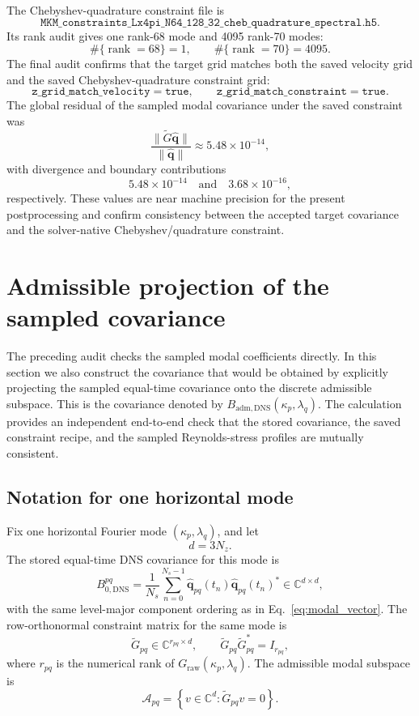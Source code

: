 \documentclass[11pt]{article}
\newcommand{\bfq}{\bm{q}}
\newcommand{\Graw}{G_{\mathrm{raw}}}
\newcommand{\Gtilde}{\widetilde{G}}
\newcommand{\Bzero}{B_{0,\mathrm{DNS}}}
\newcommand{\Badm}{B_{\mathrm{adm},\mathrm{DNS}}}
\begin{document}
The Chebyshev-quadrature constraint file is
\[
  \texttt{MKM\_constraints\_Lx4pi\_N64\_128\_32\_cheb\_quadrature\_spectral.h5}.
\]
Its rank audit gives one rank-68 mode and 4095 rank-70 modes:
\[
  \#\{ \operatorname{rank}=68\}=1,\qquad
  \#\{ \operatorname{rank}=70\}=4095.
\]
The final audit confirms that the target grid matches both the saved velocity
grid and the saved Chebyshev-quadrature constraint grid:
\[
  \texttt{z\_grid\_match\_velocity}=\texttt{true},\qquad
  \texttt{z\_grid\_match\_constraint}=\texttt{true}.
\]
The global residual of the sampled modal covariance under the saved constraint
was
\[
  \frac{\|\Gtilde\widehat{\bfq}\|}{\|\widehat{\bfq}\|}
  \approx 5.48\times 10^{-14},
\]
with divergence and boundary contributions
\[
  5.48\times 10^{-14}
  \quad\text{and}\quad
  3.68\times 10^{-16},
\]
respectively. These values are near machine precision for the present
postprocessing and confirm consistency between the accepted target covariance
and the solver-native Chebyshev/quadrature constraint.

\section{Admissible projection of the sampled covariance}
\label{sec:projected_covariance}

The preceding audit checks the sampled modal coefficients directly. In this
section we also construct the covariance that would be obtained by explicitly
projecting the sampled equal-time covariance onto the discrete admissible
subspace. This is the covariance denoted by
\(\Badm(\kappa_p,\lambda_q)\). The calculation provides an independent
end-to-end check that the stored covariance, the saved constraint recipe, and
the sampled Reynolds-stress profiles are mutually consistent.

\subsection{Notation for one horizontal mode}

Fix one horizontal Fourier mode \((\kappa_p,\lambda_q)\), and let
\[
  d = 3N_z.
\]
The stored equal-time DNS covariance for this mode is
\[
  \Bzero^{pq}
  =
  \frac{1}{N_s}
  \sum_{n=0}^{N_s-1}
  \widehat{\bfq}_{pq}(t_n)
  \widehat{\bfq}_{pq}(t_n)^*
  \in\mathbb{C}^{d\times d},
  \label{eq:project_b0_definition}
\]
with the same level-major component ordering as in
Eq.~\eqref{eq:modal_vector}. The row-orthonormal constraint matrix for the
same mode is
\begin{equation}
  \Gtilde_{pq}\in\mathbb{C}^{r_{pq}\times d},
  \qquad
  \Gtilde_{pq}\Gtilde_{pq}^*=I_{r_{pq}},
  \label{eq:project_gtilde_rows}
\end{equation}
where \(r_{pq}\) is the numerical rank of \(\Graw(\kappa_p,\lambda_q)\).
The admissible modal subspace is
\[
  \mathcal{A}_{pq}
  =
  \left\{v\in\mathbb{C}^{d}:\Gtilde_{pq}v=0\right\}.
  \label{eq:admissible_subspace}
\]
\end{document}
